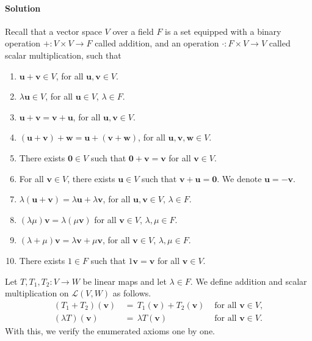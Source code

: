 \documentclass[10pt]{article}
\def\u{\bm{u}}
\def\v{\bm{v}}
\def\w{\bm{w}}
\def\L{\mathcal{L}}
\begin{document}
        \paragraph{Solution}
        Recall that a vector space $V$ over a field $F$ is a set equipped with a binary operation $+\colon V\times V \to F$ called addition, 
        and an operation $\cdot\colon F\times V \to V$ called scalar multiplication, such that
        \begin{enumerate}
                \item $\u + \v \in V$, for all $\u, \v \in V$.
                \item $\lambda\u \in V$, for all $\u \in V$, $\lambda \in F$.
                \item $\u + \v = \v + \u$, for all $\u, \v \in V$.
                \item $(\u + \v) + \w = \u + (\v + \w)$, for all $\u, \v, \w \in V$.
                \item There exists $\mathbf{0} \in V$ such that $\mathbf{0} + \v = \v$ for all $\v \in V$.
                \item For all $\v \in V$, there exists $\u \in V$ such that $\v + \u = \mathbf{0}$. We denote $\u = -\v$.
                \item $\lambda(\u + \v) = \lambda \u + \lambda \v$, for all $\u, \v \in V$, $\lambda \in F$.
                \item $(\lambda \mu)\v = \lambda(\mu\v)$ for all $\v \in V$, $\lambda, \mu \in F$.
                \item $(\lambda + \mu)\v = \lambda\v + \mu\v$, for all $\v \in V$, $\lambda, \mu \in F$.
                \item There exists $1 \in F$ such that $1\v = \v$ for all $\v \in V$.
        \end{enumerate}
        Let $T, T_1, T_2\colon V \to W$ be linear maps and let $\lambda \in F$. We define addition and scalar multiplication 
        on $\L(V, W)$ as follows.
        \begin{align*}
                (T_1 + T_2)(\v) \,&=\, T_1(\v) + T_2(\v) &\text{ for all } \v \in V, \\
                (\lambda T)(\v) \,&=\, \lambda T(\v) &\text{ for all } \v \in V.
        \end{align*}
        With this, we verify the enumerated axioms one by one.
\end{document}

